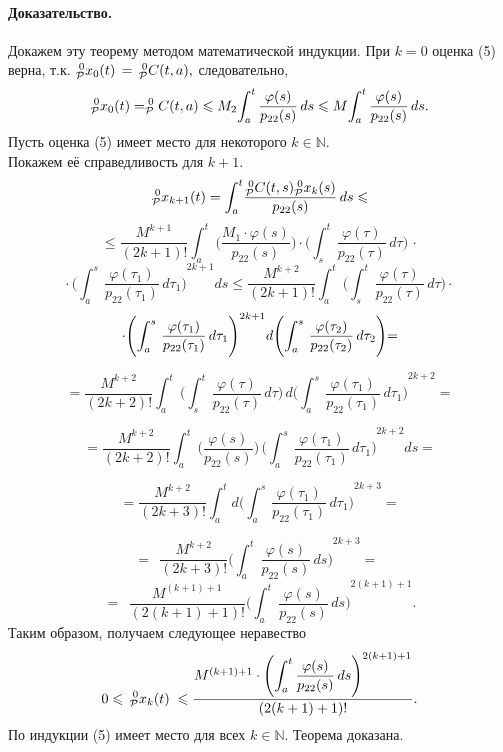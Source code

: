 \paragraph{Доказательство.}
Докажем эту теорему методом математической индукции.
При $k=0$ оценка (5) верна, т.к.\linebreak
$_{\cal P}^{\;0}x_{0}(t) \,= \,_{\cal P}^{\;0}C(t,a),$
следовательно,
$$_{\cal P}^{\;0}x_{0}(t) = _{\cal P}^{\;0}C(t,a)\leqslant M_{2}
{\int_{a}^{t}}\,
\dfrac{\varphi(s)}{p_{22}(s)}\,ds  
\leqslant
M
{\int_{a}^{t}}\,
\dfrac{\varphi(s)}{p_{22}(s)}\,ds.  
$$
Пусть оценка (5) имеет место для некоторого 
$k {\in{\mathbb N}} $. 
\\
Покажем её справедливость для $k+1.$
$$
_{\cal P}^{\;0}x_{k+1}(t)=\displaystyle{\int_{a}^{t}}
\dfrac{_{\cal P}^{\;0}C(t,s)_{\cal P}^{\;0}x_{k}(s)}
{p_{22}(s)}\,ds
\leqslant
$$
$$
\leqslant
\dfrac{M^{k+1}}{(2k+1)!}
\displaystyle{\int_{a}^{t}}\,
\Bigg(\dfrac{M_{1}\cdot\varphi(s)}{p_{22}(s)}\Bigg)
\cdot
{\Bigg(\int_{s}^{t}}\,
\dfrac{\varphi(\tau)}{p_{22}(\tau)}\,d\tau\Bigg)\,\cdot
$$
$$
\cdot\,
\displaystyle{\Bigg({\int_{a}^{s}\,
\dfrac{\varphi(\tau_1)}{p_{22}(\tau_1)}\,d\tau_1\Bigg)}  
^{2k+1}}
ds
\leqslant
\dfrac{M^{k+2}}{(2k+1)!}
\displaystyle{\int_{a}^{t}}\,
{\Bigg(\int_{s}^{t}}\,
\dfrac{\varphi(\tau)}{p_{22}(\tau)}\,d\tau\Bigg)\cdot
$$
$$
\cdot
\displaystyle{\Bigg({\int_{a}^{s}\,
\dfrac{\varphi(\tau_1)}{p_{22}(\tau_1)}\,d\tau_1\Bigg)}  
^{2k+1}}
d
\displaystyle{\Bigg({\int_{a}^{s}\,
\dfrac{\varphi(\tau_2)}{p_{22}(\tau_2)}\,d\tau_2\Bigg)}}
\small{=}
$$

$$
=
\dfrac{M^{k+2}}{(2k+2)!}
\displaystyle{\int_{a}^{t}}\,
{\Bigg(\int_{s}^{t}}\,
\dfrac{\varphi(\tau)}{p_{22}(\tau)}\,d\tau\Bigg)\,
d
\displaystyle{\Bigg({\int_{a}^{s}\,
\dfrac{\varphi(\tau_1)}{p_{22}(\tau_1)}\,d\tau_1\Bigg)}
^{2k+2}}
=
$$

$$
=
\dfrac{M^{k+2}}{(2k+2)!}
\displaystyle{\int_{a}^{t}}\,
\Bigg(
\dfrac{\varphi(s)}{p_{22}(s)}\Bigg)\,
\displaystyle{\Bigg({\int_{a}^{s}\,
\dfrac{\varphi(\tau_1)}{p_{22}(\tau_1)}\,d\tau_1\Bigg)}
^{2k+2}}
ds
=
$$

$$
=
\dfrac{M^{k+2}}{(2k+3)!}
\displaystyle{\int_{a}^{t}}
d
\displaystyle{\Bigg({\int_{a}^{s}\,
\dfrac{\varphi(\tau_1)}{p_{22}(\tau_1)}\,d\tau_1\Bigg)}
^{2k+3}}=
$$

$$
=\;\,
\dfrac{M^{k+2}}{(2k+3)!}
{\displaystyle{\Bigg({\int_{a}^{t}\,
\dfrac{\varphi(s)}{p_{22}(s)}\,ds\Bigg)}
^{2k+3}}}
=\;\,
$$
$$
=\;\,
\dfrac{M^{(k+1)+1}}{(2(k+1)+1)!}
{\displaystyle{\Bigg({\int_{a}^{t}\,
\dfrac{\varphi(s)}{p_{22}(s)}\,ds\Bigg)}
^{2(k+1)+1}}}.
$$
Таким образом, получаем следующее неравество
$$
0 \leqslant \, _{\cal P}^{\;0}x_{k}(t)\; \leqslant
\dfrac{M^{(k+1)+1} \cdot \displaystyle{\Bigg({\int_{a}^{t}}\,
\dfrac{\varphi(s)}{p_{22}(s)}\,ds\Bigg)}
^{2(k+1)+1}_{}} {(2(k+1)+1)!}.
$$
По индукции (5) имеет место для всех $k {\in{\mathbb N}} $.
\;Теорема доказана. 
